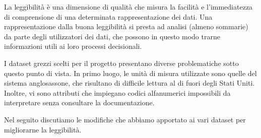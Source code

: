 La leggibilità è una dimensione di qualità che misura la facilità e 
l'immediatezza di comprensione di una determinata rappresentazione dei dati. 
Una rappresentazione dalla buona leggibilità si presta ad analisi (almeno 
sommarie) da parte degli utilizzatori dei dati, che possono in questo modo 
trarne informazioni utili ai loro processi decisionali.

I dataset grezzi scelti per il progetto presentano diverse problematiche sotto 
questo punto di vista. In primo luogo, le unità di misura utilizzate sono 
quelle del sistema anglosassone, che risultano di difficile lettura al di fuori 
degli Stati Uniti. Inoltre, vi sono attributi che impiegano codici alfanumerici 
impossibili da interpretare senza consultare la documentazione.

Nel seguito discutiamo le modifiche che abbiamo apportato ai vari dataset per 
migliorarne la leggibilità.

